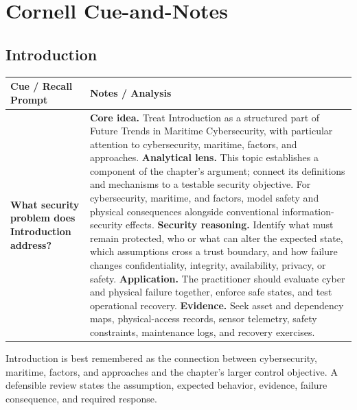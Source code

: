 \documentclass[11pt]{article}
\newcommand{\CornellHeader}{%
\rowcolor{Navy}\color{white}\bfseries Cue / Recall Prompt & \color{white}\bfseries Notes / Analysis\\\hline}
\newcommand{\CornellRow}[2]{%
\cellcolor{CueGray}\RaggedRight\textbf{#1} & \RaggedRight #2\\\hline}
\begin{document}
\section*{Cornell Cue-and-Notes}
\subsection*{Introduction}
\begin{longtable}{>{\RaggedRight\arraybackslash}p{}|>{\RaggedRight\arraybackslash}p{}}
\CornellHeader
\CornellRow{What security problem does Introduction address?}{\textbf{Core idea.} Treat Introduction as a structured part of Future Trends in Maritime Cybersecurity, with particular attention to cybersecurity, maritime, factors, and approaches. \textbf{Analytical lens.} This topic establishes a component of the chapter's argument; connect its definitions and mechanisms to a testable security objective. For cybersecurity, maritime, and factors, model safety and physical consequences alongside conventional information-security effects. \textbf{Security reasoning.} Identify what must remain protected, who or what can alter the expected state, which assumptions cross a trust boundary, and how failure changes confidentiality, integrity, availability, privacy, or safety. \textbf{Application.} The practitioner should evaluate cyber and physical failure together, enforce safe states, and test operational recovery. \textbf{Evidence.} Seek asset and dependency maps, physical-access records, sensor telemetry, safety constraints, maintenance logs, and recovery exercises.}
\end{longtable}
\begin{topicsummary}
Introduction is best remembered as the connection between cybersecurity, maritime, factors, and approaches and the chapter's larger control objective. A defensible review states the assumption, expected behavior, evidence, failure consequence, and required response.
\end{topicsummary}
\end{document}

